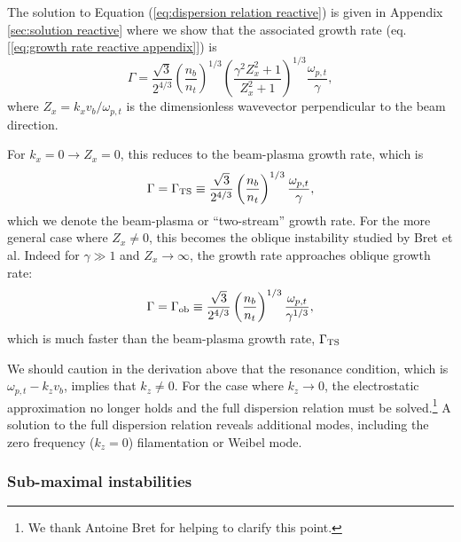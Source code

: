 \documentclass[usenatbib,iop,apj,numberedappendix]{aeb_emulateapj_2015}
\begin{document}
The solution to Equation (\ref{eq:dispersion relation reactive}) is given in Appendix \ref{sec:solution reactive} where we show that the associated growth rate (eq.[\ref{eq:growth rate reactive appendix}]) is 
\begin{equation}\label{eq:growth rate reactive}
 \Gamma = \frac{\sqrt{3}}{2^{4/3}}\left(\frac{n_b}{n_t}\right)^{1/3}\left(\frac{\gamma^2 Z_x^2 + 1}{Z_x^2 + 1}\right)^{1/3}\frac{\omega_{p,t}}{\gamma},
\end{equation}
where $Z_x = k_xv_b/\omega_{p,t}$ is the dimensionless wavevector perpendicular to the beam direction.

For $k_x = 0 \rightarrow Z_x = 0$, this reduces to the beam-plasma growth rate, which is
\begin{equation}\label{eq:growth rate bp}
 \Gamma = \Gamma_{\rm TS} \equiv \frac{\sqrt{3}}{2^{4/3}}\left(\frac{n_b}{n_t}\right)^{1/3}\frac{\omega_{p,t}}{\gamma},
\end{equation}
which we denote the beam-plasma or ``two-stream'' growth rate.
For the more general case where $Z_x\ne 0$, this becomes the oblique instability studied by Bret et al.  Indeed for $\gamma \gg 1$ and $Z_x \rightarrow \infty$, the growth rate approaches oblique growth rate:
\begin{equation}
 \Gamma = \Gamma_{\rm ob} \equiv \frac{\sqrt{3}}{2^{4/3}}\left(\frac{n_b}{n_t}\right)^{1/3}\frac{\omega_{p,t}}{\gamma^{1/3}},
\end{equation}
which is much faster than the beam-plasma growth rate, $\Gamma_{\rm TS}$

We should caution in the derivation above that the resonance condition, which is $\omega_{p,t} - k_z v_b$, implies that $k_z \neq 0$.  For the case where $k_z \rightarrow 0$, the electrostatic approximation no longer holds and the full dispersion relation must be solved.\footnote{We thank Antoine Bret for helping to clarify this point.}  A solution to the full dispersion relation reveals additional modes, including the zero frequency ($k_z = 0$) filamentation or Weibel mode. 

\subsubsection{Sub-maximal instabilities}
\end{document}
